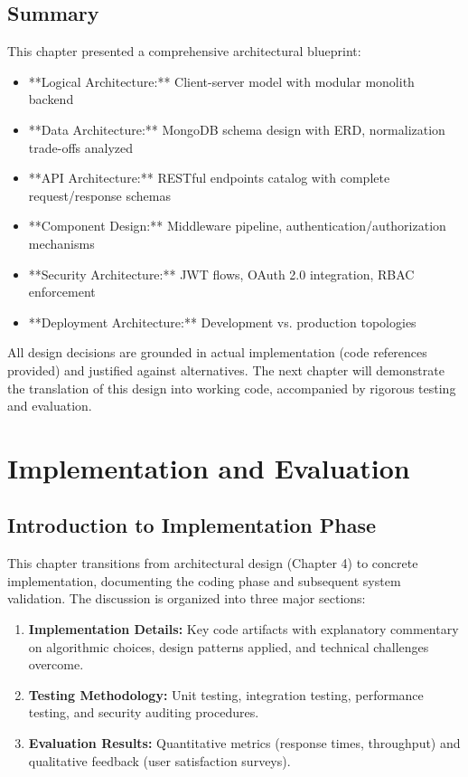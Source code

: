 \section{Summary}

This chapter presented a comprehensive architectural blueprint:

\begin{itemize}
    \item **Logical Architecture:** Client-server model with modular monolith backend
    \item **Data Architecture:** MongoDB schema design with ERD, normalization trade-offs analyzed
    \item **API Architecture:** RESTful endpoints catalog with complete request/response schemas
    \item **Component Design:** Middleware pipeline, authentication/authorization mechanisms
    \item **Security Architecture:** JWT flows, OAuth 2.0 integration, RBAC enforcement
    \item **Deployment Architecture:** Development vs. production topologies
\end{itemize}

All design decisions are grounded in actual implementation (code references provided) and justified against alternatives. The next chapter will demonstrate the translation of this design into working code, accompanied by rigorous testing and evaluation.


\chapter{Implementation and Evaluation}

\section{Introduction to Implementation Phase}

This chapter transitions from architectural design (Chapter 4) to concrete implementation, documenting the coding phase and subsequent system validation. The discussion is organized into three major sections:

\begin{enumerate}
    \item \textbf{Implementation Details:} Key code artifacts with explanatory commentary on algorithmic choices, design patterns applied, and technical challenges overcome.
    \item \textbf{Testing Methodology:} Unit testing, integration testing, performance testing, and security auditing procedures.
    \item \textbf{Evaluation Results:} Quantitative metrics (response times, throughput) and qualitative feedback (user satisfaction surveys).
\end{enumerate}

